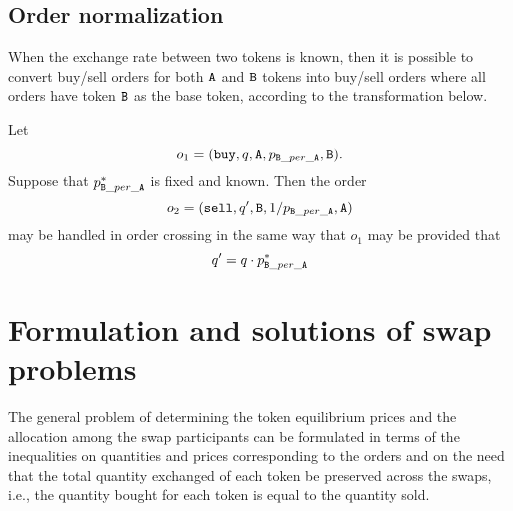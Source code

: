 \documentclass[11pt, reqno]{amsart}
\theoremstyle{definition}
\theoremstyle{remark}
\newcommand{\tA}{\textnormal{\texttt{A}}}
\newcommand{\tB}{\textnormal{\texttt{B}}}
\newcommand{\buy}{\textnormal{\texttt{buy}}}
\newcommand{\sell}{\textnormal{\texttt{sell}}}
\begin{document}
\subsection{Order normalization}
When the exchange rate between two tokens is known, then it is possible to
convert buy/sell orders for both $\tA$ and $\tB$ tokens into buy/sell orders
where all orders have token $\tB$ as the base token, according to the
transformation below.

Let
\[
	o_1 = (\buy, q, \tA, p_{\tB\_per\_\tA}, \tB).
\]
Suppose that $p^*_{\tB\_per\_\tA}$ is fixed and known. Then the order
\[
	o_2 = (\sell, q^\prime, \tB, 1 / p_{\tB\_per\_\tA}, \tA)
\]
may be handled in order crossing in the same way that $o_1$ may be
provided that
\[
	q^\prime = q \cdot p^*_{\tB\_per\_\tA}
\]

%
%
%

%
%


\section{Formulation and solutions of swap problems}
The general problem of determining the token equilibrium prices and the
allocation among the swap participants can be formulated in terms of the
inequalities on quantities and prices corresponding to the orders and on the
need that the total quantity exchanged of each token be preserved across the
swaps, i.e., the quantity bought for each token is equal to the quantity sold.
\end{document}
